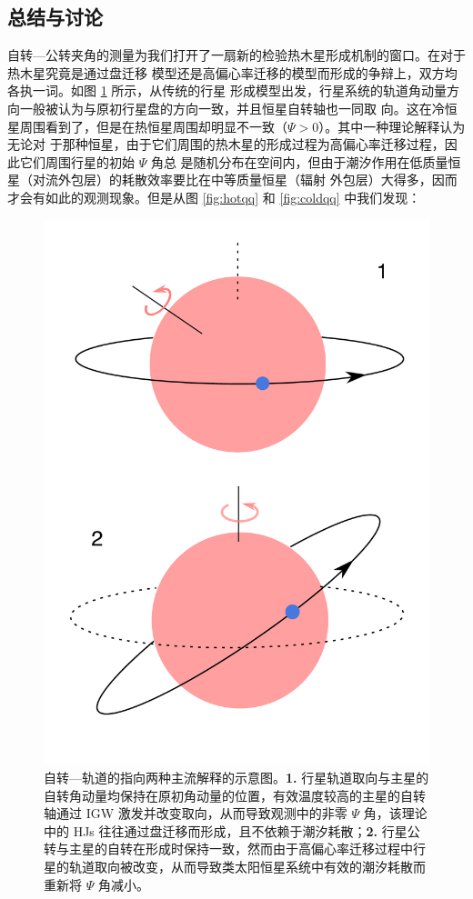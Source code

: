 \subsection{总结与讨论}

自转---公转夹角的测量为我们打开了一扇新的检验热木星形成机制的窗口。在对于热木星究竟是通过盘迁移
模型还是高偏心率迁移的模型而形成的争辩上，双方均各执一词。如图 \ref{fig:som2th} 所示，从传统的行星
形成模型出发，行星系统的轨道角动量方向一般被认为与原初行星盘的方向一致，并且恒星自转轴也一同取
向。这在冷恒星周围看到了，但是在热恒星周围却明显不一致（$\Psi > 0$）。其中一种理论解释认为无论对
于那种恒星，由于它们周围的热木星的形成过程为高偏心率迁移过程，因此它们周围行星的初始 $\Psi$ 角总
是随机分布在空间内，但由于潮汐作用在低质量恒星（对流外包层）的耗散效率要比在中等质量恒星（辐射
外包层）大得多，因而才会有如此的观测现象\cite{Albrecht2012}。但是从图 \ref{fig:hotqq} 和 \ref{fig:coldqq} 
中我们发现：

\begin{figure}[t!]
\centering
\includegraphics[height=0.85\textheight]{figures/chapter4/fig11_som2th.pdf}
\caption{自转---轨道的指向两种主流解释的示意图。\textbf{1.} 行星轨道取向与主星的自转角动量均保持在原初角动量的位置，有效温度较高的主星的自转轴通过 IGW 激发并改变取向，从而导致观测中的非零 $\Psi$ 角，该理论中的 HJs 往往通过盘迁移而形成，且不依赖于潮汐耗散；\textbf{2.} 行星公转与主星的自转在形成时保持一致，然而由于高偏心率迁移过程中行星的轨道取向被改变，从而导致类太阳恒星系统中有效的潮汐耗散而重新将 $\Psi$ 角减小。}
\label{fig:som2th}
\end{figure}

